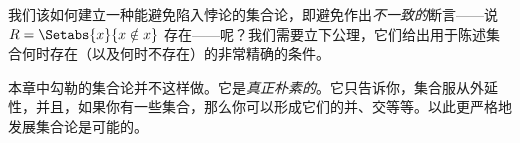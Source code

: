 \documentclass[../../../include/open-logic-section]{subfiles}
\begin{document}
\begin{digress}
我们该如何建立一种能避免陷入悖论的集合论，即避免作出\emph{不一致的}断言——说 $R = \Setabs{x}{x \notin x}$ 存在——呢？我们需要立下公理，它们给出用于陈述集合何时存在（以及何时不存在）的非常精确的条件。

本章中勾勒的集合论并不这样做。它是\emph{真正朴素的}。它只告诉你，集合服从外延性，并且，如果你有一些集合，那么你可以形成它们的并、交等等。以此更严格地发展集合论是可能的。
\end{digress}
\end{document}
